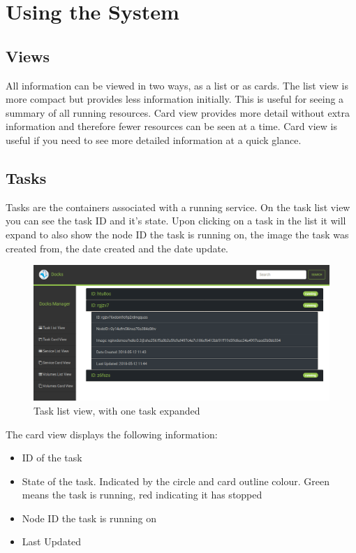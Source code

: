 \documentclass[]{article}
\providecommand{\tightlist}{%
	\setlength{\itemsep}{0pt}\setlength{\parskip}{0pt}}
\begin{document}
\section{Using the System}

\subsection{Views}
All information can be viewed in two ways, as a list or as cards. The list view is more compact but provides less
information initially. This is useful for seeing a summary of all running resources. Card view provides more detail
without extra information and therefore fewer resources can be seen at a time. Card view is useful if you
need to see more detailed information at a quick glance.

\subsection{Tasks}
Tasks are the containers associated with a running service. On the task list view you can see the task ID and it's state. Upon clicking on a task in the list it will expand to also show the node ID the task is running on, the image the task was created from, the date created and the date update.

\begin{figure}[H]
	\centering
	\includegraphics[scale=0.4]{task_list.png}
	\caption{Task list view, with one task expanded}
\end{figure}

The card view displays the following information:
\begin{itemize}
	\tightlist
	\item ID of the task
	\item State of the task. Indicated by the circle and card outline colour. Green means the task is running, red indicating it has stopped
	\item Node ID the task is running on
	\item Last Updated
\end{itemize}
\end{document}
